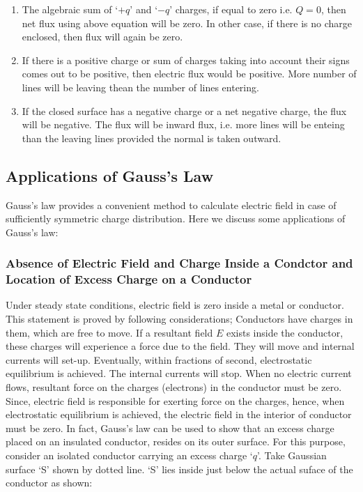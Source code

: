 \begin{enumerate}[label=(\roman*)] 
\item The algebraic sum of `$+q$' and `$-q$' charges,
if equal to zero i.e. $Q = 0$, then net flux using above equation 
will be zero. In other case, if there is no charge enclosed, then flux
 will again be zero.
\item If there is a positive charge or sum of charges taking into account
their signs comes out to be positive, then electric flux would be positive.
More number of lines will be leaving thean the number of lines entering.
\item If the closed surface has a negative charge or a net negative charge,
the flux will be negative. The flux will be inward flux, i.e. more lines
will be enteing than the leaving lines provided the normal is taken outward.
\end{enumerate}

\subsection{Applications of Gauss’s Law}
Gauss’s law provides a convenient method to calculate electric field in case of sufficiently symmetric charge distribution.
Here we discuss some applications of Gauss’s law:

\subsubsection{Absence of Electric Field and Charge Inside
a Condctor and Location of Excess Charge on a Conductor}
Under steady state conditions, electric field is zero inside a
metal or conductor. This statement is proved by following considerations;
Conductors have charges in them, which are free to move.
If a resultant field $E$ exists inside the conductor,
these charges will experience a force due to the field.
They will move and internal currents will set-up. Eventually,
within fractions of second, electrostatic equilibrium is achieved.
The internal currents will stop. When no electric current flows,
resultant force on the charges (electrons) in the conductor must be zero.
Since, electric field is responsible for exerting force on the charges,
hence, when electrostatic equilibrium is achieved, the electric field in
the interior of conductor must be zero.
In fact, Gauss’s law can be used to show that an excess charge
placed on an insulated conductor, resides on its outer surface.
For this purpose, consider an isolated conductor carrying an excess charge
`$q$'. Take Gaussian surface `S’ shown by dotted line. `S’ lies inside just
below the actual suface of the conductor as shown:

